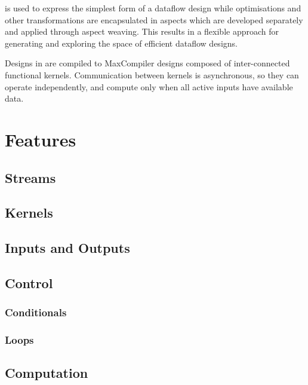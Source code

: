 \FAST{} is used to express the simplest form of a dataflow design
while optimisations and other transformations are encapsulated in
aspects which are developed separately and applied through aspect
weaving. This results in a flexible approach for generating and
exploring the space of efficient dataflow designs.

Designs in \FAST{} are compiled to MaxCompiler designs composed of
inter-connected functional kernels. Communication between kernels is
asynchronous, so they can operate independently, and compute only when
all active inputs have available data.

\section{Features}

\subsection{Streams}

\subsection{Kernels}

\subsection{Inputs and Outputs}

\subsection{Control}

\subsubsection*{Conditionals}

\subsubsection*{Loops}

\subsection{Computation}




